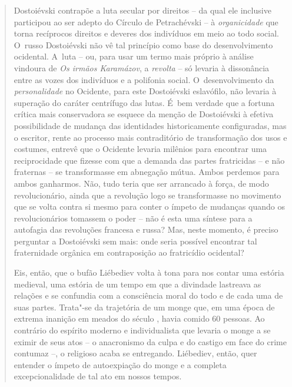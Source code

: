 {\begin{quote}
Dostoiévski contrapõe a luta secular por direitos -- da qual ele
inclusive participou ao ser adepto do Círculo de Petrachévski -- à
\emph{organicidade} que torna recíprocos direitos e deveres dos
indivíduos em meio ao todo social. O~russo Dostoiévski não vê tal
princípio como base do desenvolvimento ocidental. A~luta -- ou, para
usar um termo mais próprio à análise vindoura de \emph{Os irmãos
Karamázov}, a \emph{revolta} -- só levaria à dissonância entre as vozes
dos indivíduos e a polifonia social. O~desenvolvimento da
\emph{personalidade} no Ocidente, para este Dostoiévski eslavófilo, não
levaria à superação do caráter centrífugo das lutas. É~bem verdade que a
fortuna crítica mais conservadora se esquece da menção de Dostoiévski à
efetiva possibilidade de mudança das identidades historicamente
configuradas, mas o escritor, rente ao processo mais contraditório de
transformação dos usos e costumes, entrevê que o Ocidente levaria
milênios para encontrar uma reciprocidade que fizesse com que a demanda
das partes fratricidas -- e não fraternas -- se transformasse em
abnegação mútua. Ambos perdemos para ambos ganharmos. Não, tudo teria
que ser arrancado à força, de modo revolucionário, ainda que a revolução
logo se transformasse no movimento que se volta contra si mesmo para
conter o ímpeto de mudanças quando os revolucionários tomassem o poder
-- não é esta uma síntese para a autofagia das revoluções francesa e
russa? Mas, neste momento, é preciso perguntar a Dostoiévski sem mais:
onde seria possível encontrar tal fraternidade orgânica em contraposição
ao fratricídio ocidental?

Eis, então, que o bufão Liébediev volta à tona para nos contar uma
estória medieval, uma estória de um tempo em que a divindade lastreava
as relações e se confundia com a consciência moral do todo e de cada uma
de suas partes. Trata"-se da trajetória de um monge que, em uma época de
extrema inanição em meados do século , havia comido 60 pessoas. Ao
contrário do espírito moderno e individualista que levaria o monge a se
eximir de seus atos -- o anacronismo da culpa e do castigo em face do
crime contumaz --, o religioso acaba se entregando. Liébediev, então,
quer entender o ímpeto de autoexpiação do monge e a completa
excepcionalidade de tal ato em nossos tempos.


\end{quote}}
